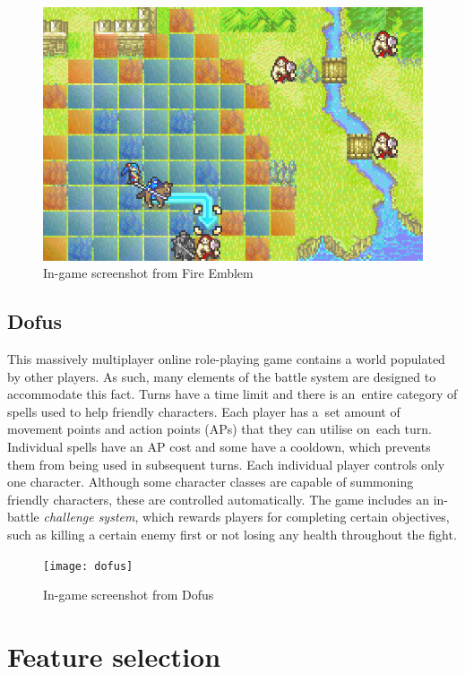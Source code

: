 \documentclass[thesis=B,english,hidelinks]{FITthesisXE}[2012/06/26]
\begin{document}
\begin{figure}[ht]
\centering
\includegraphics[scale=0.4]{fire1}
\caption{In-game screenshot from Fire Emblem}
\label{fig:fire}
\end{figure}

\subsection{Dofus}

This massively multiplayer online role-playing game contains a world populated by other players. As such, many elements of the battle system are designed to accommodate this fact. Turns have a time limit and there is an~entire category of spells used to help friendly characters. Each player has a~set amount of movement points and action points (APs) that they can utilise on~each turn. Individual spells have an AP cost and some have a cooldown, which prevents them from being used in subsequent turns. Each individual player controls only one character. Although some character classes are capable of summoning friendly characters, these are controlled automatically. The game includes an in-battle \emph{challenge system}, which rewards players for completing certain objectives, such as killing a certain enemy first or not losing any health throughout the fight.

\begin{figure}[ht]
\centering
\texttt{[image: dofus]}
\caption{In-game screenshot from Dofus}
\label{fig:dofus}
\end{figure}

\newpage

\section{Feature selection}
\end{document}
